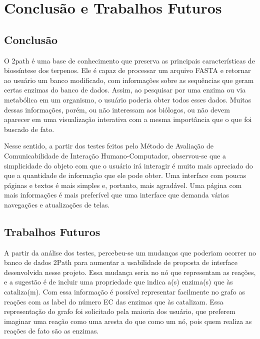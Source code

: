 \chapter{Conclusão e Trabalhos Futuros}

\section*{Conclusão}

\indent O 2path é uma base de conhecimento que preserva as principais características de biossíntese dos terpenos. Ele é capaz de processar um arquivo FASTA e retornar ao usuário um banco modificado, com informações sobre as sequências que geram certas enzimas do banco de dados. Assim, ao pesquisar por uma enzima ou via metabólica em um organismo, o usuário poderia obter todos esses dados. Muitas dessas informações, porém, ou não interessam aos biólogos, ou não devem aparecer em uma visualização interativa com a mesma importância que o que foi buscado de fato.

\indent Nesse sentido, a partir dos testes feitos pelo Método de Avaliação de Comunicabilidade de Interação Humano-Computador, observou-se que a simplicidade do objeto com que o usuário irá interagir é muito mais apreciado do que a quantidade de informação que ele pode obter. Uma interface com poucas páginas e textos é mais simples e, portanto, mais agradável. Uma página com mais informações é mais preferível que uma interface que demanda várias navegações e atualizações de telas.

\section*{Trabalhos Futuros}

\indent A partir da análise dos testes, percebeu-se um mudanças que poderiam ocorrer no banco de dados 2Path para aumentar a usabilidade de proposta de interface desenvolvida nesse projeto. Essa mudança seria no nó que representam as reações, e a sugestão é de incluir uma propriedade que indica a(s) enzima(s) que às cataliza(m). Com essa informação é possível representar facilmente no grafo as reações com as label do número EC das enzimas que às catalizam. Essa representação do grafo foi solicitado pela maioria dos usuário, que preferem imaginar uma reação como uma aresta do que como um nó, pois quem realiza as reações de fato são as enzimas.